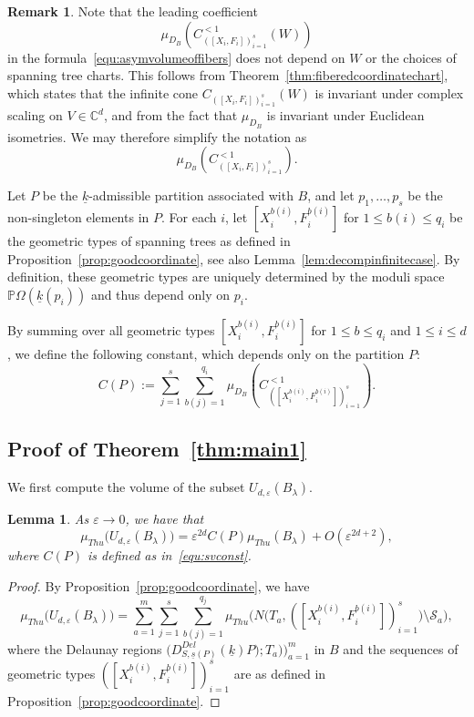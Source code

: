 \documentclass{compositio}
\numberwithin{equation}{section}
\numberwithin{figure}{section}
\theoremstyle{definition}
\newtheorem{remark}[definition]{Remark}
\theoremstyle{plain}
\newtheorem{lemma}[definition]{Lemma}
\begin{document}
{\begin{remark}\label{rmk:independenceofvolumeoffibers}
Note that the leading coefficient
$$
\mu_{D_B}\left(C^{< 1}_{([X_i, F_i])_{i=1}^s}(W)\right)
$$
in the formula~\eqref{equ:asymvolumeoffibers} does not depend on $W$ or the choices of spanning tree charts. This follows from Theorem~\ref{thm:fiberedcoordinatechart}, which states that the infinite cone $C_{([X_i, F_i])_{i=1}^s}(W)$ is invariant under complex scaling on $V\in\mathbb{C}^d$, and from the fact that $\mu_{D_B}$ is invariant under Euclidean isometries. We may therefore simplify the notation as
$$
\mu_{D_B}\left(C^{< 1}_{([X_i, F_i])_{i=1}^s}\right).
$$    
\end{remark}


Let $P$ be the $\underline{k}$-admissible partition associated with $B$, and let $p_1,\ldots,p_s$ be the non-singleton elements in $P$. For each $i$, let $[X_i^{b(i)}, F_i^{b(i)}]$ for $1\le b(i)\le q_i$ be the geometric types of spanning trees as defined in Proposition~\ref{prop:goodcoordinate}, see also Lemma~\ref{lem:decompinfinitecase}. By definition, these geometric types are uniquely determined by the moduli space $\mathbb{P}\Omega(\underline{k}(p_i))$ and thus depend only on $p_i$.

By summing over all geometric types $[X_i^{b(i)}, F_i^{b(i)}]$ for $1\leq b \leq q_i$ and $1\leq i\leq d$, we define the following constant, which depends only on the partition $P$:
\begin{equation}\label{equ:svconst}
    C(P) := \sum_{j=1}^{s}\sum_{b(j)=1}^{q_i} \mu_{D_B}\left(C^{< 1}_{([X^{b(i)}_i, F^{b(i)}_i])_{i=1}^s}\right).
\end{equation}

\subsection{Proof of Theorem~\ref{thm:main1}}

We first compute the volume of the subset $U_{d,\varepsilon}(B_\lambda)$.

\begin{lemma}\label{lem:thickvolume}
    As $\varepsilon \to 0$, we have that
    $$
    \mu_{Thu}\big(U_{d,\varepsilon}(B_\lambda)\big) = \varepsilon^{2d}C(P)\mu_{Thu}(B_{\lambda}) + O(\varepsilon^{2d+2}),
    $$ 
    where $C(P)$ is defined as in~\eqref{equ:svconst}.
\end{lemma}

\begin{proof}
    By Proposition~\ref{prop:goodcoordinate}, we have
    $$
    \mu_{Thu}\big(U_{d,\varepsilon}(B_\lambda)\big) = \sum_{a=1}^m\sum_{j=1}^s\sum_{b(j)=1}^{q_j} 
    \mu_{Thu}\big(N\big(T_a, ([X_i^{b(i)}, F_i^{b(i)}])_{i=1}^s\big) \setminus \mathcal{S}_a\big),
    $$
    where the Delaunay regions $\big(D_{S,\underline{s}(P)}^{Del}(\underline{k})P);T_a)\big)_{a=1}^m$ in $B$ and the sequences of geometric types $([X_i^{b(i)},F_i^{b(i)}])_{i=1}^s$ are as defined in Proposition~\ref{prop:goodcoordinate}.
    

\end{proof}}
\end{document}
